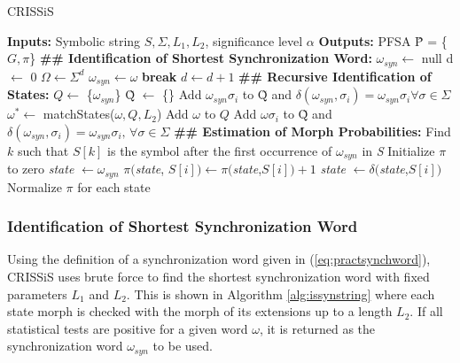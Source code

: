 {\begin{algorithm} 
  \caption{CRISSiS\label{alg:crissis}}
    \begin{algorithmic}[1]
      \State \textbf{Inputs:} Symbolic string $S, \Sigma, L_1, L_2$, significance level $\alpha$
      \State \textbf{Outputs:} PFSA \^{P} = \{$G, \pi$\}
      \State \textbf{\#\# Identification of Shortest Synchronization Word:}
      \State $\omega_{syn} \leftarrow $ null
      \State d $\leftarrow $ 0
      	\State $\Omega \leftarrow \Sigma^d$
      	\ForAll{$\omega \in \Omega$}
      			\State $\omega_{syn}\leftarrow\omega$
      			\State \textbf{break}
      		\EndIf
      	\EndFor
      	\State $d \leftarrow d + 1$
      \EndWhile
      \State \textbf{\#\# Recursive Identification of States:}
      \State $Q \leftarrow$ \{$\omega_{syn}$\}
      \State \~{Q} $\leftarrow$ \{\}
      \State Add $\omega_{syn}\sigma_i$ to \~{Q} and $\delta(\omega_{syn},\sigma_i) = \omega_{syn}\sigma_i  \forall \sigma\in\Sigma$
      		\State $\omega^* \leftarrow$ matchStates($\omega, Q, L_2$)
      			\State Add $\omega$ to $Q$
      			\State Add $\omega\sigma_i$ to \~{Q} and $\delta(\omega_{syn},\sigma_i) = \omega_{syn}\sigma_i,\,  \forall \sigma\in\Sigma$
      		\Else
      		\EndIf
      	\EndIf
      \EndFor
      \State \textbf{\#\# Estimation of Morph Probabilities:}
      \State Find $k$ such that $S[k]$ is the symbol after the first occurrence of $\omega_{syn}$ in \textit{S}
      \State Initialize $\pi$ to zero
      \State \textit{state} $\leftarrow \omega_{syn}$
		\State $\pi($\textit{state}, $S[i]) \leftarrow \pi($\textit{state},$S[i]) + 1$
		\State \textit{state} $\leftarrow \delta($\textit{state},$S[i])$      
      \EndFor 
      \State Normalize $\pi$ for each state
    \end{algorithmic}
  \end{algorithm}
  
\subsubsection{Identification of Shortest Synchronization Word}

Using the definition of a synchronization word given in (\ref{eq:practsynchword}), CRISSiS uses brute force to find the shortest synchronization word with fixed parameters $L_1$ and $L_2$. This is shown in Algorithm \ref{alg:issynstring} where each state morph is checked with the morph of its extensions up to a length $L_2$. If all statistical tests are positive for a given word $\omega$, it is returned as the synchronization word $\omega_{syn}$ to be used.

}
